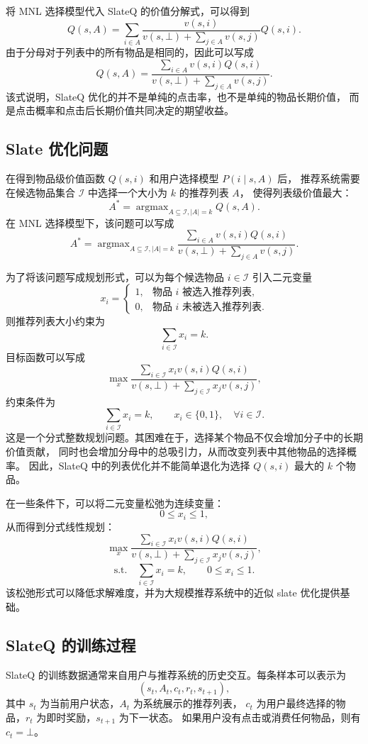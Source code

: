 \documentclass[11pt]{ctexart}
\begin{document}
将 MNL 选择模型代入 SlateQ 的价值分解式，可以得到
\[
Q(s,A)
=
\sum_{i\in A}
\frac{v(s,i)}
{v(s,\bot)+\sum_{j\in A}v(s,j)}
Q(s,i).
\]
由于分母对于列表中的所有物品是相同的，因此可以写成
\[
Q(s,A)
=
\frac{
\sum_{i\in A}v(s,i)Q(s,i)
}{
v(s,\bot)+\sum_{j\in A}v(s,j)
}.
\]
该式说明，SlateQ 优化的并不是单纯的点击率，也不是单纯的物品长期价值，
而是点击概率和点击后长期价值共同决定的期望收益。

\subsection{Slate 优化问题}

在得到物品级价值函数 $Q(s,i)$ 和用户选择模型 $P(i\mid s,A)$ 后，
推荐系统需要在候选物品集合 $\mathcal{I}$ 中选择一个大小为 $k$ 的推荐列表 $A$，
使得列表级价值最大：
\[
A^*
=
\mathop{\arg\max}_{A\subseteq \mathcal{I}, |A|=k}
Q(s,A).
\]
在 MNL 选择模型下，该问题可以写成
\[
A^*
=
\mathop{\arg\max}_{A\subseteq \mathcal{I}, |A|=k}
\frac{
\sum_{i\in A}v(s,i)Q(s,i)
}{
v(s,\bot)+\sum_{j\in A}v(s,j)
}.
\]

为了将该问题写成规划形式，可以为每个候选物品 $i\in\mathcal{I}$ 引入二元变量
\[
x_i=
\begin{cases}
1, & \text{物品 } i \text{ 被选入推荐列表},\\
0, & \text{物品 } i \text{ 未被选入推荐列表}.
\end{cases}
\]
则推荐列表大小约束为
\[
\sum_{i\in\mathcal{I}}x_i=k.
\]
目标函数可以写成
\[
\max_{x}
\frac{
\sum_{i\in\mathcal{I}}x_i v(s,i)Q(s,i)
}{
v(s,\bot)+\sum_{j\in\mathcal{I}}x_j v(s,j)
},
\]
约束条件为
\[
\sum_{i\in\mathcal{I}}x_i=k,
\qquad
x_i\in\{0,1\}, \quad \forall i\in\mathcal{I}.
\]
这是一个分式整数规划问题。其困难在于，选择某个物品不仅会增加分子中的长期价值贡献，
同时也会增加分母中的总吸引力，从而改变列表中其他物品的选择概率。
因此，SlateQ 中的列表优化并不能简单退化为选择 $Q(s,i)$ 最大的 $k$ 个物品。

在一些条件下，可以将二元变量松弛为连续变量：
\[
0\le x_i\le 1,
\]
从而得到分式线性规划：
\[
\max_{x}
\frac{
\sum_{i\in\mathcal{I}}x_i v(s,i)Q(s,i)
}{
v(s,\bot)+\sum_{j\in\mathcal{I}}x_j v(s,j)
},
\]
\[
\text{s.t.}
\quad
\sum_{i\in\mathcal{I}}x_i=k,
\qquad
0\le x_i\le 1.
\]
该松弛形式可以降低求解难度，并为大规模推荐系统中的近似 slate 优化提供基础。

\subsection{SlateQ 的训练过程}

SlateQ 的训练数据通常来自用户与推荐系统的历史交互。每条样本可以表示为
\[
(s_t,A_t,c_t,r_t,s_{t+1}),
\]
其中 $s_t$ 为当前用户状态，$A_t$ 为系统展示的推荐列表，
$c_t$ 为用户最终选择的物品，$r_t$ 为即时奖励，$s_{t+1}$ 为下一状态。
如果用户没有点击或消费任何物品，则有 $c_t=\bot$。
\end{document}
